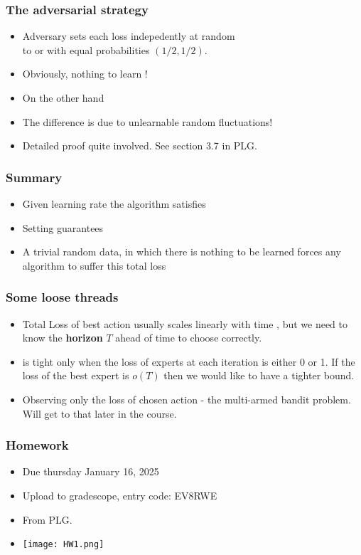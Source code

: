 \documentclass{beamer}
\begin{document}
\begin{frame}
\frametitle{The adversarial strategy}
\begin{itemize}
\item
Adversary sets each loss  indepedently at random \\
to  or  with equal probabilities $(1/2,1/2)$.
\item
Obviously, nothing to learn !\\
\item
On the other hand 
\item
The difference  is due to unlearnable
random fluctuations!
\item
Detailed proof quite involved. See section 3.7 in PLG.
\end{itemize}
\end{frame}

\begin{frame}
\frametitle{Summary}
\begin{itemize}
\item Given learning rate \R{$\eta$} the \ouralg algorithm satisfies
\item Setting  guarantees
\item
A trivial random data, in which there is nothing to be learned forces
\alert{any} algorithm to suffer this total loss
\end{itemize}
\end{frame}

\begin{frame}
\frametitle{Some loose threads}
\begin{itemize}
\item Total Loss of best action usually scales linearly with time
  , but we need to know the {\bf horizon} $T$ ahead of time to
  choose \R{$\eta$} correctly.
  \item {} is tight only when the loss of experts at each iteration is
    either 0 or 1. If the loss of the best expert is $o(T)$ then we
    would like to have a tighter bound.
\item Observing only the loss of chosen action - the multi-armed
  bandit problem. Will get to that later in the course.
\end{itemize}
\end{frame}


\begin{frame}
\frametitle{Homework}
\begin{itemize}
\item
  Due thursday January 16, 2025
\item
  Upload to gradescope, entry code: EV8RWE
\item
  From PLG.
\item
\texttt{[image: HW1.png]}
\end{itemize}
\end{frame}
\end{document}
